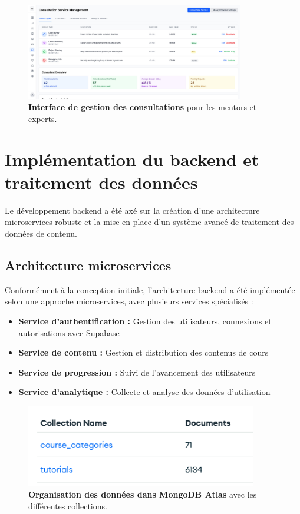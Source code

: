 \begin{figure}[H]
  \centering
  \includegraphics[width=0.85\textwidth,keepaspectratio]{old-reports/week_4_img/consultingmana.jpeg}
  \caption{\textbf{Interface de gestion des consultations} pour les mentors et experts.}
  \label{fig:consulting_management}
\end{figure}

\section{Implémentation du backend et traitement des données}

Le développement backend a été axé sur la création d'une architecture microservices robuste et la mise en place d'un système avancé de traitement des données de contenu.

\subsection{Architecture microservices}

Conformément à la conception initiale, l'architecture backend a été implémentée selon une approche microservices, avec plusieurs services spécialisés :

\begin{itemize}
  \item \textbf{Service d'authentification :} Gestion des utilisateurs, connexions et autorisations avec Supabase
  \item \textbf{Service de contenu :} Gestion et distribution des contenus de cours
  \item \textbf{Service de progression :} Suivi de l'avancement des utilisateurs
  \item \textbf{Service d'analytique :} Collecte et analyse des données d'utilisation
\end{itemize}

\begin{figure}[H]
  \centering
  \includegraphics[width=0.9\textwidth,keepaspectratio]{week_3_img/Screenshot 2025-05-19 234047.png}
  \caption{\textbf{Organisation des données dans MongoDB Atlas} avec les différentes collections.}
  \label{fig:mongodb}
\end{figure}

